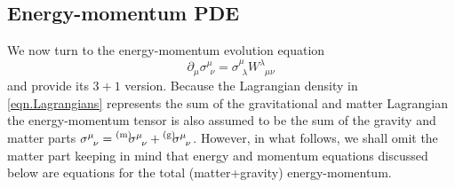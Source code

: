 \documentclass[
10pt, %
a4paper, %
oneside, %
headinclude,footinclude, %
BCOR5mm, %
]{scrartcl}
\newcommand{\pd}[1]{\partial_{#1}}
\newcommand{\w}[2]{W^{#1}_{\phantom{#1}#2}}
\newcommand{\EMmat}[2]{\sigma^{#1}_{\ \,#2}}
\newcommand{\mat}[1]{\prescript{\text{(m)}}{}{\hspace{-0.1cm}#1}}
\newcommand{\gra}[1]{\prescript{\text{(g)}}{}{\hspace{-0.1cm}#1}}
\begin{document}
\subsection{Energy-momentum PDE}\label{sec.energymomentum}

We now turn to the energy-momentum evolution equation
\begin{equation}\label{eqn.sigma.31}
	\pd{\mu}\EMmat{\mu}{\nu} 
	 = \EMmat{\mu}{\lambda} 
	\w{\lambda}{\mu\nu}
\end{equation}
and provide its $ 3+1 $ version. Because the Lagrangian density in \eqref{eqn.Lagrangians} 
represents the sum of the gravitational and matter Lagrangian the energy-momentum tensor is also 
assumed to be the sum of the gravity and matter parts $ \EMmat{\mu}{\nu} = \mat{\EMmat{\mu}{\nu}} + 
\gra{\EMmat{\mu}{\nu}} $. However, in what follows, we shall omit the matter part keeping in mind 
that energy and momentum equations discussed below are equations for the total (matter+gravity) 
energy-momentum. 
\end{document}

